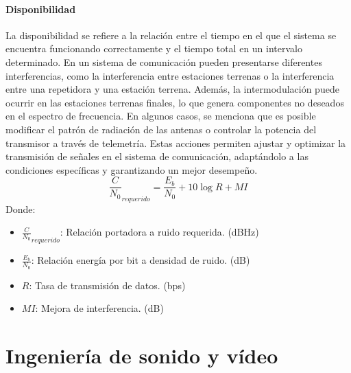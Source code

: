 \documentclass[
	12pt, %
	fleqn, %
	a4paper, %
	oneside, %
]{LegrandOrangeBook}
\begin{document}
\subsection{Disponibilidad}
La disponibilidad se refiere a la relación entre el tiempo en el que el sistema se encuentra funcionando correctamente y el tiempo total en un intervalo determinado. En un sistema de comunicación pueden presentarse diferentes interferencias, como la interferencia entre estaciones terrenas o la interferencia entre una repetidora y una estación terrena. Además, la intermodulación puede ocurrir en las estaciones terrenas finales, lo que genera componentes no deseados en el espectro de frecuencia. En algunos casos, se menciona que es posible modificar el patrón de radiación de las antenas o controlar la potencia del transmisor a través de telemetría. Estas acciones permiten ajustar y optimizar la transmisión de señales en el sistema de comunicación, adaptándolo a las condiciones específicas y garantizando un mejor desempeño.
\begin{equation}
\frac{C}{N_0}_{requerido}=\frac{E_b}{N_0}+10\log R+MI
\end{equation}
Donde:
\begin{itemize}
  \item $\frac{C}{N_0}_{requerido}$: Relación portadora a ruido requerida. (dBHz)
  \item $\frac{E_b}{N_0}$: Relación energía por bit a densidad de ruido. (dB)
  \item $R$: Tasa de transmisión de datos. (bps)
  \item $MI$: Mejora de interferencia. (dB)
\end{itemize}
\part{Ingeniería de sonido y vídeo}
\end{document}
